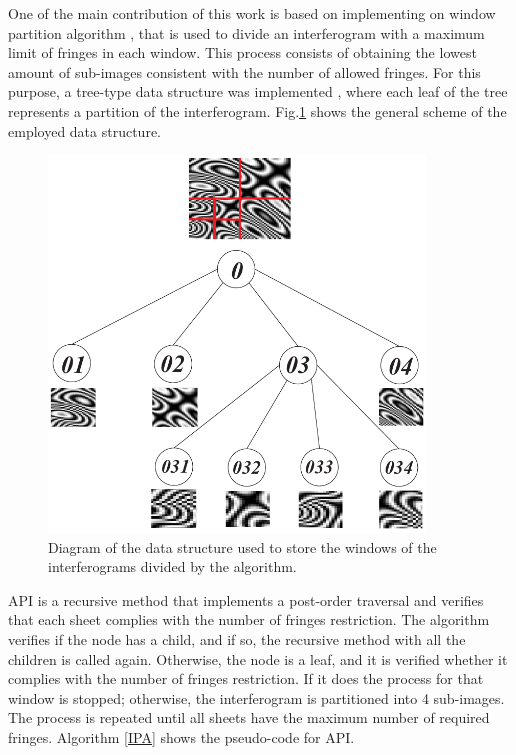 \documentclass[review]{elsarticle}
\begin{document}
One of the main contribution of this work is based on implementing on window partition algorithm \cite{Cuevas2006a}, that is used to divide an interferogram with a maximum limit of fringes in each window. This process consists of obtaining the lowest amount of sub-images consistent with the number of allowed fringes. For this purpose, a tree-type data structure was implemented \cite{goodrich2004data}, where each leaf of the tree represents a partition of the interferogram. Fig.\ref{Fig1} shows the general scheme of the employed data structure.
\begin{figure}[ht]
    \centering\includegraphics[width=10cm]{fig1}
	\caption{Diagram of the data structure used to store the windows of the interferograms divided by the algorithm.}
 	\label{Fig1}
\end{figure}

API is a recursive method that implements a post-order traversal and verifies that each sheet complies with the number of fringes restriction. The algorithm verifies if the node has a child, and if so, the recursive method with all the children is called again. Otherwise, the node is a leaf, and it is verified whether it complies with the number of fringes restriction. If it does the process for that window is stopped; otherwise, the interferogram is partitioned into 4 sub-images. The process is repeated until all sheets have the maximum number of required fringes. Algorithm \ref{IPA} shows the pseudo-code for API.
 
\end{document}
